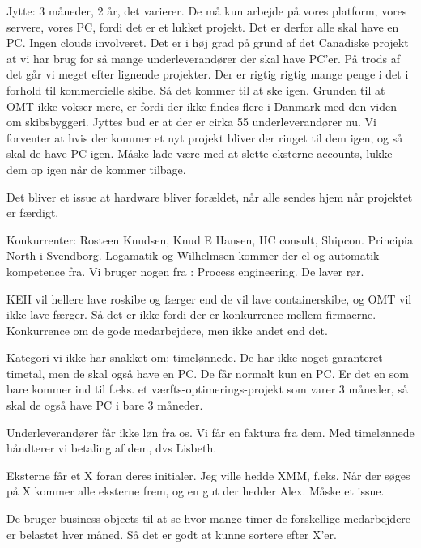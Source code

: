 Jytte:
3 måneder, 2 år, det varierer. De må kun arbejde på vores platform, 
vores servere, vores PC, fordi det er et lukket projekt.
Det er derfor alle skal have en PC. Ingen clouds involveret.
Det er i høj grad på grund af det Canadiske projekt
at vi har brug for så mange underleverandører der skal have PC’er. 
På trods af det går vi meget efter lignende projekter.
Der er rigtig rigtig mange penge i det i forhold til kommercielle skibe.
Så det kommer til at ske igen.
Grunden til at OMT ikke vokser mere, er fordi der ikke findes flere i Danmark
med den viden om skibsbyggeri. 
Jyttes bud er at der er cirka 55 underleverandører nu.
Vi forventer at hvis der kommer et nyt projekt bliver der ringet til dem igen,
og så skal de have PC igen.
Måske lade være med at slette eksterne accounts,
lukke dem op igen når de kommer tilbage.

Det bliver et issue at hardware bliver forældet,
når alle sendes hjem når projektet er færdigt.

Konkurrenter:
Rosteen Knudsen, Knud E Hansen, HC consult, Shipcon. Principia North i Svendborg. 
Logamatik og Wilhelmsen kommer der el og automatik kompetence fra.
Vi bruger nogen fra : Process engineering. De laver rør.

KEH vil hellere lave roskibe og færger end de vil lave containerskibe,
og OMT vil ikke lave færger. Så det er ikke fordi der er konkurrence mellem
firmaerne. 
Konkurrence om de gode medarbejdere, men ikke andet end det.

Kategori vi ikke har snakket om: timelønnede.
De har ikke noget garanteret timetal, men de skal også have en PC.
De får normalt kun en PC. Er det en som bare kommer ind til f.eks.
et værfts-optimerings-projekt som varer 3 måneder,
så skal de også have PC i bare 3 måneder.

Underleverandører får ikke løn fra os. Vi får en faktura fra dem. 
Med timelønnede håndterer vi betaling af dem, dvs Lisbeth.

Eksterne får et X foran deres initialer. Jeg ville hedde XMM, f.eks.
Når der søges på X kommer alle eksterne frem, og en gut der hedder Alex.
Måske et issue.

De bruger business objects til at se hvor mange timer
de forskellige medarbejdere er belastet hver måned.
Så det er godt at kunne sortere efter X’er.